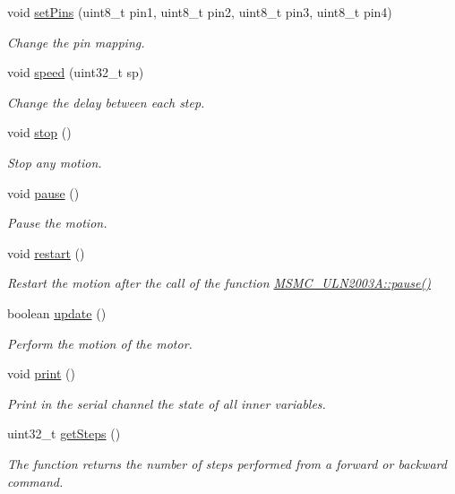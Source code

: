 \begin{DoxyCompactItemize}
void \hyperlink{class_m_s_m_c___u_l_n2003_a_a19320fa4543dd8e76e338737690df235}{set\+Pins} (uint8\+\_\+t pin1, uint8\+\_\+t pin2, uint8\+\_\+t pin3, uint8\+\_\+t pin4)
\begin{DoxyCompactList}\small\item\em Change the pin mapping. \end{DoxyCompactList}\item 
void \hyperlink{class_m_s_m_c___u_l_n2003_a_ad8df164c90b2205fb65c796632889f82}{speed} (uint32\+\_\+t sp)
\begin{DoxyCompactList}\small\item\em Change the delay between each step. \end{DoxyCompactList}\item 
void \hyperlink{class_m_s_m_c___u_l_n2003_a_aba5e18f20f31fd4d6e71f50821dfeee5}{stop} ()
\begin{DoxyCompactList}\small\item\em Stop any motion. \end{DoxyCompactList}\item 
void \hyperlink{class_m_s_m_c___u_l_n2003_a_aa1d3444465d59ca6c87f05f565dde4a2}{pause} ()
\begin{DoxyCompactList}\small\item\em Pause the motion. \end{DoxyCompactList}\item 
void \hyperlink{class_m_s_m_c___u_l_n2003_a_a19853d77f81c521091a55996899c1784}{restart} ()
\begin{DoxyCompactList}\small\item\em Restart the motion after the call of the function \hyperlink{class_m_s_m_c___u_l_n2003_a_aa1d3444465d59ca6c87f05f565dde4a2}{M\+S\+M\+C\+\_\+\+U\+L\+N2003\+A\+::pause()} \end{DoxyCompactList}\item 
boolean \hyperlink{class_m_s_m_c___u_l_n2003_a_acdf6b6224352a90146e67ee9837d0a6f}{update} ()
\begin{DoxyCompactList}\small\item\em Perform the motion of the motor. \end{DoxyCompactList}\item 
void \hyperlink{class_m_s_m_c___u_l_n2003_a_aa6743162bdaba01ef1fc8a79f2519897}{print} ()
\begin{DoxyCompactList}\small\item\em Print in the serial channel the state of all inner variables. \end{DoxyCompactList}\item 
uint32\+\_\+t \hyperlink{class_m_s_m_c___u_l_n2003_a_a06c602281da9eebbd38dc4151c137609}{get\+Steps} ()
\begin{DoxyCompactList}\small\item\em The function returns the number of steps performed from a forward or backward command. \end{DoxyCompactList}\end{DoxyCompactItemize}


